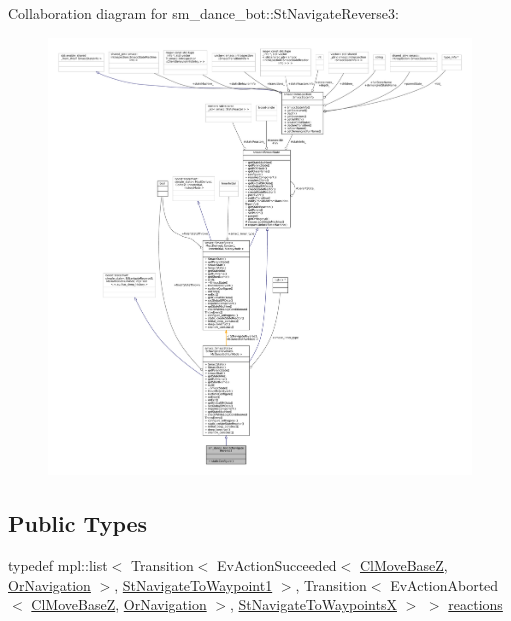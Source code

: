 Collaboration diagram for sm\+\_\+dance\+\_\+bot\+:\+:St\+Navigate\+Reverse3\+:
\nopagebreak
\begin{figure}[H]
\begin{center}
\leavevmode
\includegraphics[width=350pt]{structsm__dance__bot_1_1StNavigateReverse3__coll__graph}
\end{center}
\end{figure}
\subsection*{Public Types}
\begin{DoxyCompactItemize}
\item 
typedef mpl\+::list$<$ Transition$<$ Ev\+Action\+Succeeded$<$ \hyperlink{classmove__base__z__client_1_1ClMoveBaseZ}{Cl\+Move\+BaseZ}, \hyperlink{classsm__dance__bot_1_1OrNavigation}{Or\+Navigation} $>$, \hyperlink{structsm__dance__bot_1_1StNavigateToWaypoint1}{St\+Navigate\+To\+Waypoint1} $>$, Transition$<$ Ev\+Action\+Aborted$<$ \hyperlink{classmove__base__z__client_1_1ClMoveBaseZ}{Cl\+Move\+BaseZ}, \hyperlink{classsm__dance__bot_1_1OrNavigation}{Or\+Navigation} $>$, \hyperlink{structsm__dance__bot_1_1StNavigateToWaypointsX}{St\+Navigate\+To\+WaypointsX} $>$ $>$ \hyperlink{structsm__dance__bot_1_1StNavigateReverse3_ab55c811a489098c4f9fb1cd8db2da32f}{reactions}
\end{DoxyCompactItemize}
